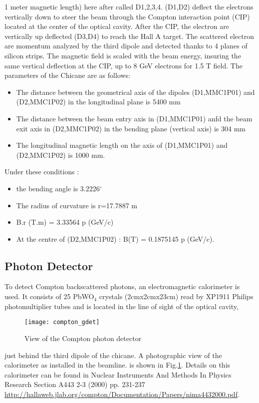 {{1 meter magnetic length) here after called D1,2,3,4.
(D1,D2) deflect  the electrons  vertically down to steer
the beam through the Compton interaction point (CIP) located at the center of
the optical cavity. After the CIP, the electron are vertically up deflected (D3,D4) to reach
the Hall A target. The scattered electron are momentum analyzed by the third dipole and
detected thanks to 4 planes of silicon strips.
The magnetic field is scaled with the beam energy, insuring the same vertical deflection at the CIP,
up to 8 GeV electrons for 1.5 T field. The parameters of the Chicane are as follows:
\begin{itemize}
\item The distance between the geometrical axis of the
        dipoles (D1,MMC1P01) and (D2,MMC1P02) in the longitudinal plane is 5400 mm
	\item The distance between the beam entry axis in (D1,MMC1P01) anfd the
        beam exit axis in (D2,MMC1P02) in the bending plane (vertical axis) is 304 mm
	\item The longitudinal magnetic length on the axis of (D1,MMC1P01) and
	(D2,MMC1P02) is 1000 mm.
\end{itemize}

\par Under these conditions :
\begin{itemize}
    \item the bending angle is 3.2226$^{\circ}$
    \item The radius of curvature is r=17.7887 m
    \item B.r (T.m) = 3.33564 p (GeV/c)
    \item At the centre of (D2,MMC1P02) : B(T) = 0.1875145 p (GeV/c).
\end{itemize}

\subsection{Photon Detector}
To detect Compton backscattered photons, an electromagnetic
calorimeter is used. It consists of 25 PbWO$_4$ crystals (2cmx2cmx23cm) read by XP1911
Philips photomultiplier tubes and is located in the line of sight of the optical cavity,
\label{sec:compton_gdet}
\begin{figure}[htp]
    \begin{center}
        \texttt{[image: compton\_gdet]}
    \end{center}
    \caption[compton:photon detector]{
            View of the Compton photon detector
            }
    \label{fig:compton_gdet}
 \end{figure}
just behind the third  dipole of the chicane.
 A photographic view of the calorimeter as installed in the beamline.
 is shown in Fig.\ref{fig:compton_gdet}. 
Details on this calorimeter can be found
in  Nuclear Instruments And Methods In Physics Research Section A443 2-3 (2000) pp. 231-237
\url{http://hallaweb.jlab.org/compton/Documentation/Papers/nima4432000.pdf}.

}}
